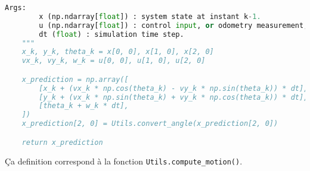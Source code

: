 \documentclass[../CSC_5RO12_TA_TP2.tex]{subfiles}
\begin{document}
\begin{definition}
\begin{scriptsize}
\begin{lstlisting}[language=Python, caption=\texttt{motion\_model\_prediction()}]
    Args:
        x (np.ndarray[float]) : system state at instant k-1.
        u (np.ndarray[float]) : control input, or odometry measurement, at instant k.
        dt (float) : simulation time step.
    """
    x_k, y_k, theta_k = x[0, 0], x[1, 0], x[2, 0]
    vx_k, vy_k, w_k = u[0, 0], u[1, 0], u[2, 0]

    x_prediction = np.array([
        [x_k + (vx_k * np.cos(theta_k) - vy_k * np.sin(theta_k)) * dt],
        [y_k + (vx_k * np.sin(theta_k) + vy_k * np.cos(theta_k)) * dt],
        [theta_k + w_k * dt],
    ])
    x_prediction[2, 0] = Utils.convert_angle(x_prediction[2, 0])

    return x_prediction
        \end{lstlisting}
    \end{scriptsize}
    \begin{remark}
        Ça definition correspond à la fonction \texttt{Utils.compute\_motion()}.
    \end{remark}
\end{definition}
\end{document}
